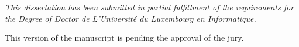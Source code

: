 
\vspace*{\fill}
\begin{center}
{\it This dissertation has been submitted in partial fulfillment of
the requirements for the Degree of Doctor de L'Universit\'{e} du Luxembourg en Informatique. 

\vskip1cm

This version of the manuscript is pending the approval
of the jury.}
\end{center}
\vspace*{\fill}
\vspace*{\fill}
\vspace*{\fill}
